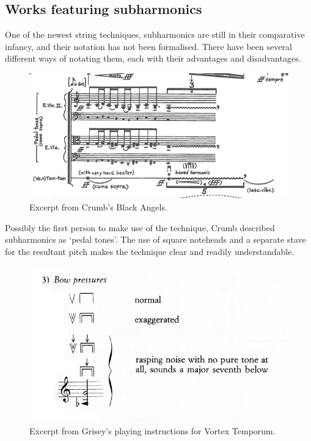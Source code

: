 \subsection{Works featuring subharmonics}
One of the newest string techniques, subharmonics are still in their comparative infancy, and their notation has not been formalised. There have been several different ways of notating them, each with their advantages and disadvantages.


\begin{figure}
    \includegraphics[width=\linewidth]{./resources/crumbBlackAngels.png}
    \caption{Excerpt from Crumb's Black Angels.}
    \label{fig:Excerpt from Crumb's Black Angels}
  \end{figure}
Possibly the first person to make use of the technique, Crumb described subharmonics as `pedal tones'. The use of square noteheads and a separate stave for the resultant pitch makes the technique clear and readily understandable.

\begin{figure}
    \includegraphics[width=\linewidth]{./resources/griseyVortexTemporum.jpg}
    \caption{Excerpt from Grisey's playing instructions for Vortex Temporum.}
    \label{fig:Excerpt from Grisey's playing instructions for Vortex Temporum}
  \end{figure}


